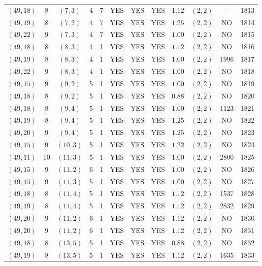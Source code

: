 \begin{longtable}{|c|c|c|c|c|c|c|c|c|c|c|c|}
$(49,18)$ & 8 & $(7,3)$ & 4 & 7 & YES & YES & YES & $1.12$ & $(2,2)$ & -- & 1813\\
$(49,19)$ & 8 & $(7,2)$ & 4 & 7 & YES & YES & YES & $1.25$ & $(2,2)$ & NO & 1814\\
$(49,22)$ & 9 & $(7,3)$ & 4 & 7 & YES & YES & YES & $1.00$ & $(2,2)$ & NO & 1815\\
$(49,18)$ & 8 & $(8,3)$ & 4 & 1 & YES & YES & YES & $1.12$ & $(2,2)$ & NO & 1816\\
$(49,19)$ & 8 & $(8,3)$ & 4 & 1 & YES & YES & YES & $1.00$ & $(2,2)$ & 1996 & 1817\\
$(49,22)$ & 9 & $(8,3)$ & 4 & 1 & YES & YES & YES & $1.00$ & $(2,2)$ & NO & 1818\\
$(49,15)$ & 9 & $(9,2)$ & 5 & 1 & YES & YES & YES & $1.00$ & $(2,2)$ & NO & 1819\\
$(49,18)$ & 8 & $(9,2)$ & 5 & 1 & YES & YES & YES & $0.88$ & $(2,2)$ & NO & 1820\\
$(49,18)$ & 8 & $(9,4)$ & 5 & 1 & YES & YES & YES & $1.00$ & $(2,2)$ & 1123 & 1821\\
$(49,19)$ & 8 & $(9,4)$ & 5 & 1 & YES & YES & YES & $1.25$ & $(2,2)$ & NO & 1822\\
$(49,20)$ & 9 & $(9,4)$ & 5 & 1 & YES & YES & YES & $1.25$ & $(2,2)$ & NO & 1823\\
$(49,15)$ & 9 & $(10,3)$ & 5 & 1 & YES & YES & YES & $1.22$ & $(2,2)$ & NO & 1824\\
$(49,11)$ & 10 & $(11,3)$ & 5 & 1 & YES & YES & YES & $1.00$ & $(2,2)$ & 2800 & 1825\\
$(49,15)$ & 9 & $(11,2)$ & 6 & 1 & YES & YES & YES & $1.00$ & $(2,2)$ & NO & 1826\\
$(49,15)$ & 9 & $(11,3)$ & 5 & 1 & YES & YES & YES & $1.00$ & $(2,2)$ & NO & 1827\\
$(49,18)$ & 8 & $(11,4)$ & 5 & 1 & YES & YES & YES & $1.12$ & $(2,2)$ & 1537 & 1828\\
$(49,19)$ & 8 & $(11,4)$ & 5 & 1 & YES & YES & YES & $1.12$ & $(2,2)$ & 2832 & 1829\\
$(49,20)$ & 9 & $(11,2)$ & 6 & 1 & YES & YES & YES & $1.12$ & $(2,2)$ & NO & 1830\\
$(49,20)$ & 9 & $(11,2)$ & 6 & 1 & YES & YES & YES & $1.12$ & $(2,2)$ & NO & 1831\\
$(49,18)$ & 8 & $(13,5)$ & 5 & 1 & YES & YES & YES & $0.88$ & $(2,2)$ & NO & 1832\\
$(49,19)$ & 8 & $(13,5)$ & 5 & 1 & YES & YES & YES & $1.12$ & $(2,2)$ & 1635 & 1833\\

\end{longtable}
